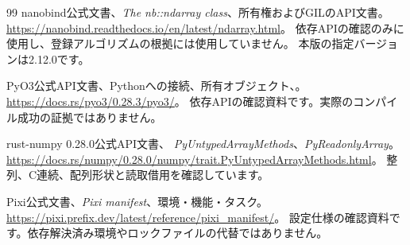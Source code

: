 \documentclass[a4paper,11pt]{article}
\newcommand{\code}[1]{\texttt{\detokenize{#1}}}
\numberwithin{equation}{section}
\begin{document}
\begin{thebibliography}{99}
 nanobind公式文書、\emph{The nb::ndarray class}、所有権およびGILのAPI文書。
\url{https://nanobind.readthedocs.io/en/latest/ndarray.html}。
依存APIの確認のみに使用し、登録アルゴリズムの根拠には使用していません。
本版の指定バージョンは2.12.0です。

 PyO3公式API文書、Pythonへの接続、所有オブジェクト、\code{Python::detach}。
\url{https://docs.rs/pyo3/0.28.3/pyo3/}。
依存APIの確認資料です。実際のコンパイル成功の証拠ではありません。

 rust-numpy 0.28.0公式API文書、
\emph{PyUntypedArrayMethods}、\emph{PyReadonlyArray}。
\url{https://docs.rs/numpy/0.28.0/numpy/trait.PyUntypedArrayMethods.html}。
整列、C連続、配列形状と読取借用を確認しています。

 Pixi公式文書、\emph{Pixi manifest}、環境・機能・タスク。
\url{https://pixi.prefix.dev/latest/reference/pixi_manifest/}。
設定仕様の確認資料です。依存解決済み環境やロックファイルの代替ではありません。
\end{thebibliography}
\end{document}
